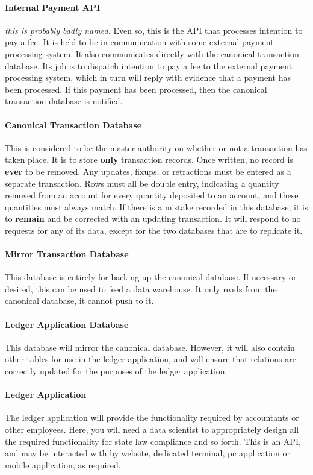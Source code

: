 \paragraph{Internal Payment API} \textit{this is probably badly named.}  Even
so, this is the API that processes intention to pay a fee.  It is held to be in
communication with some external payment processing system.  It also
communicates directly with the canonical transaction database.  Its job is to
dispatch intention to pay a fee to the external payment processing system,
which in turn will reply with evidence that a payment has been processed.  If
this payment has been processed, then the canonical transaction database is
notified.

\paragraph{Canonical Transaction Database}  This is considered to be the master
authority on whether or not a transaction has taken place.  It is to store
\textbf{only} transaction records.  Once written, no record is \textbf{ever} to
be removed.  Any updates, fixups, or retractions must be entered as a separate
transaction.  Rows must all be double entry, indicating a quantity removed from
an account for every quantity deposited to an account, and these quantities
must always match.  If there is a mistake recorded in this database, it is to
\textbf{remain} and be corrected with an updating transaction.  It will respond
to no requests for any of its data, except for the two databases that are to
replicate it.

\paragraph{Mirror Transaction Database} This database is entirely for backing
up the canonical database.  If necessary or desired, this can be used to feed a
data warehouse.  It only reads from the canonical database, it cannot push to
it.

\paragraph{Ledger Application Database} This database will mirror the canonical
database.  However, it will also contain other tables for use in the ledger
application, and will ensure that relations are correctly updated for the
purposes of the ledger application.

\paragraph{Ledger Application} The ledger application will provide the
functionality required by accountants or other employees.  Here, you will need
a data scientist to appropriately design all the required functionality for
state law compliance and so forth.  This is an API, and may be interacted with
by website, dedicated terminal, pc application or mobile application, as
required.


